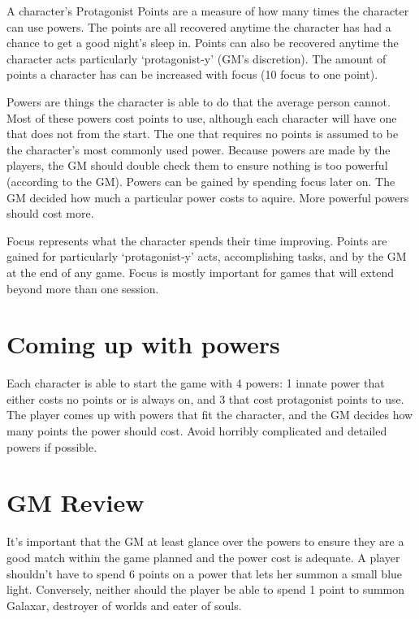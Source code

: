 \begin{flushleft}
A character's Protagonist Points are a measure of how many times the character
can use powers. The points are all recovered anytime the character has had a
chance to get a good night's sleep in. Points can also be recovered anytime
the character acts particularly `protagonist-y' (GM's discretion). The amount
of points a character has can be increased with focus (10 focus to one point).

Powers are things the character is able to do that the average person cannot.
Most of these powers cost points to use, although each character will have
one that does not from the start. The one that requires no points is assumed
to be the character's most commonly used power. Because powers are made by the
players, the GM should double check them to ensure nothing is too powerful
(according to the GM). Powers can be gained by spending focus later on. The GM
decided how much a particular power costs to aquire. More powerful powers
should cost more.

Focus represents what the character spends their time improving. Points are
gained for particularly `protagonist-y' acts, accomplishing tasks, and by
the GM at the end of any game. Focus is mostly important for games that will
extend beyond more than one session.

\section*{Coming up with powers}

Each character is able to start the game with 4 powers: 1 innate power that
either costs no points or is always on, and 3 that cost protagonist points to
use. The player comes up with powers that fit the character, and the GM
decides how many points the power should cost. Avoid horribly complicated and
detailed powers if possible.

\section*{GM Review}
It's important that the GM at least glance over the powers to ensure they are
a good match within the game planned and the power cost is adequate. A player
shouldn't have to spend 6 points on a power that lets her summon a small blue
light. Conversely, neither should the player be able to spend 1 point to
summon Galaxar, destroyer of worlds and eater of souls.


\end{flushleft}
